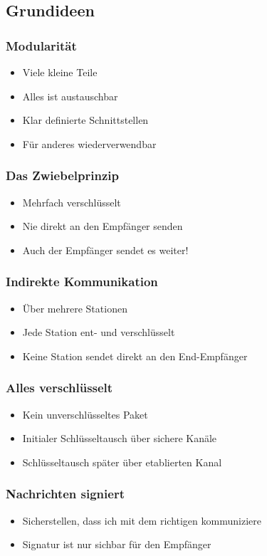 \documentclass{beamer}
\begin{document}
\subsection{Grundideen}
\frame
{
  \frametitle{Modularit\"at}

  \begin{itemize}
  \item Viele kleine Teile
  \pause
  \item Alles ist austauschbar
  \pause
  \item Klar definierte Schnittstellen
  \pause
  \item F\"ur anderes wiederverwendbar
  \end{itemize}
}


\frame
{
  \frametitle{Das Zwiebelprinzip}

  \begin{itemize}
  \item Mehrfach verschl\"usselt
  \pause
  \item Nie direkt an den Empf\"anger senden
  \pause
  \item Auch der Empf\"anger sendet es weiter!
  \end{itemize}
}

\frame
{
  \frametitle{Indirekte Kommunikation}

  \begin{itemize}
  \item \"Uber mehrere Stationen
  \pause
  \item Jede Station ent- und verschl\"usselt
  \pause
  \item Keine Station sendet direkt an den End-Empf\"anger
  \end{itemize}
}


\frame
{
  \frametitle{Alles verschl\"usselt}

  \begin{itemize}
  \item Kein unverschl\"usseltes Paket
  \pause
  \item Initialer Schl\"usseltausch \"uber sichere Kan\"ale
  \pause
  \item Schl\"usseltausch sp\"ater \"uber etablierten Kanal
  \end{itemize}
}


\frame
{
  \frametitle{Nachrichten signiert}

  \begin{itemize}
  \item Sicherstellen, dass ich mit dem richtigen kommuniziere
  \pause
  \item Signatur ist nur sichbar f\"ur den Empf\"anger
  \end{itemize}
}
\end{document}
